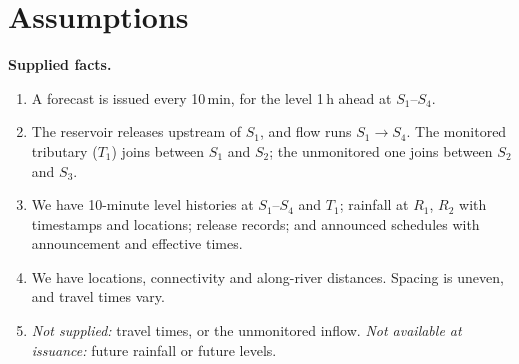 \documentclass[11pt,a4paper]{article}
\begin{document}
\section{Assumptions}
\textbf{Supplied facts.}
\begin{enumerate}[label=\textbf{F\arabic*}, ref=F\arabic*, leftmargin=*]
  \item A forecast is issued every 10\,min, for the level 1\,h ahead at $S_1$--$S_4$.
  \item The reservoir releases upstream of $S_1$, and flow runs $S_1\!\to\!S_4$.
        The monitored tributary ($T_1$) joins between $S_1$ and $S_2$; the
        unmonitored one joins between $S_2$ and $S_3$.
  \item We have 10-minute level histories at $S_1$--$S_4$ and $T_1$; rainfall at
        $R_1$, $R_2$ with timestamps and locations; release records; and
        announced schedules with announcement and effective times.
  \item We have locations, connectivity and along-river distances. Spacing is
        uneven, and travel times vary.
  \item \emph{Not supplied:} travel times, or the unmonitored inflow.
        \emph{Not available at issuance:} future rainfall or future levels.
\end{enumerate}
\end{document}
